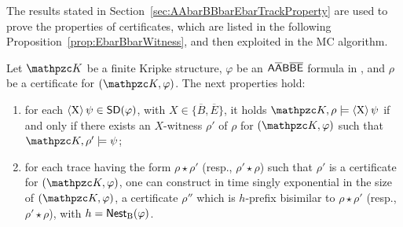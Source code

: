 The results stated in Section~\ref{sec:AAbarBBbarEbarTrackProperty} are used to prove the properties of certificates, which are listed in the following Proposition~\ref{prop:EbarBbarWitness}, and then exploited in the MC algorithm.
%
\begin{proposition}\label{prop:EbarBbarWitness} Let $\Ku$ be a finite Kripke structure,  $\varphi$ be an $\mathsf{A\overline{A}B\overline{B}\overline{E}}$ formula  in \nnf, and $\rho$ be a certificate for $(\Ku,\varphi)$. The next properties hold:
\begin{enumerate}
  \item for each $\operatorname{\langle X\rangle}\psi\in\textsf{SD}(\varphi)$, with $X\in \{\overline{B}, \overline{E}\}$, it holds $\Ku,\rho\models \hsX\psi$ if and only if there exists an $X$-witness $\rho'$ of $\rho$
  for $(\Ku,\varphi)$ such that $\Ku,\rho'\models \psi$;
  \item for each trace having the form $\rho\star\rho'$ (resp., $\rho'\star\rho$) such that $\rho'$ is a certificate for $(\Ku,\varphi)$, one can construct in time singly exponential in the size of $(\Ku,\varphi)$,
  a certificate $\rho''$ which is $h$-prefix bisimilar to $\rho\star\rho'$ (resp., $\rho'\star\rho$), with $h=\operatorname{\mathsf{Nest}_B}(\varphi)$.
\end{enumerate}
\end{proposition}
